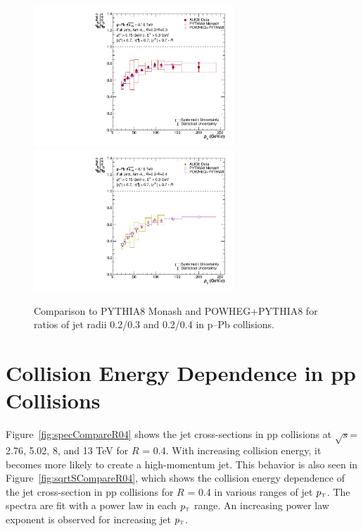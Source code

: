 \documentclass[ALICE]{ALICE_analysis_notes}
\newcommand{\pT}{$p_{\mbox{\tiny T}}$\xspace}
\newcommand{\s}{$\sqrt{s}$\xspace}
\newcommand{\pPb}{{\mbox{p--Pb}}\xspace}
\newcommand{\pp}{pp\xspace}
\begin{document}
\begin{figure}
    \centering
    \begin{multicols}{2}
            \includegraphics[width=7.5cm]{figures/pPbFigures/MCGen/MCComp_Ratio_R0302_nooutlier.pdf}
        \vfill\null
        \columnbreak
            \includegraphics[width=7.5cm]{figures/pPbFigures/MCGen/MCComp_Ratio_R0402_nooutlier.pdf}
        \vfill\null
    \end{multicols}
    \caption{Comparison to PYTHIA8 Monash and POWHEG+PYTHIA8 for ratios of jet radii 0.2/0.3 and 0.2/0.4 in \pPb collisions.}
    \label{fig:MCGen_Ratio_pPb}
\end{figure}

\section{Collision Energy Dependence in \pp Collisions}
\label{sec:CollEnergyDep}

Figure~\ref{fig:specCompareR04} shows the jet cross-sections in \pp collisions at \s = 2.76, 5.02, 8, and 13 TeV for $R$ = 0.4. With increasing collision energy, it becomes more likely to create a high-momentum jet. This behavior is also seen in Figure~\ref{fig:sqrtSCompareR04}, which shows the collision energy dependence of the jet cross-section in \pp collisions for $R$ = 0.4 in various ranges of jet \pT. The spectra are fit with a power law in each \pT range. An increasing power law exponent is observed for increasing jet \pT.
\end{document}
